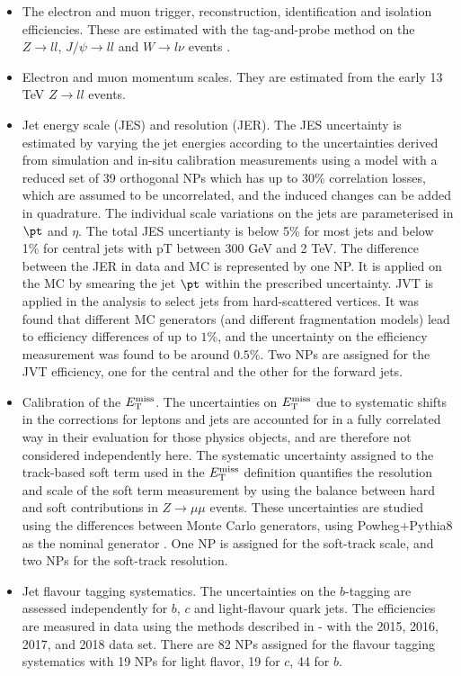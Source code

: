 \begin{itemize}
\item The electron and muon trigger, reconstruction, identification and isolation efficiencies. These are estimated with the tag-and-probe method on the $Z\to ll$, $J/\psi\to ll$ and $W\to l\nu$ events \cite{lep_sys}.
\item Electron and muon momentum scales. They are estimated from the early 13 TeV $Z\to ll$ events.
\item Jet energy scale (JES) and resolution (JER). The JES uncertainty is estimated by varying the jet energies according to the uncertainties derived from simulation and in-situ calibration measurements using a model with a reduced set of 39 orthogonal NPs \cite{jet_sys} which has up to 30\% correlation losses, which are assumed to be uncorrelated, and the induced changes can be added in quadrature. The individual scale variations on the jets are parameterised in $\pt$ and $\eta$. The total JES uncertianty is below 5\% for most jets and below 1\% for central jets with pT between 300 GeV and 2 TeV.
The difference between the JER in data and MC is represented by one NP. It is applied on the MC by smearing the jet $\pt$ within the prescribed uncertainty.
JVT is applied in the analysis to select jets from hard-scattered vertices. It was found that different MC generators (and different fragmentation models) lead to efficiency differences of up to $1\%$, and the uncertainty on the efficiency measurement was found to be around $0.5\%$. Two NPs are assigned for the JVT efficiency, one for the central and the other for the forward jets.
\item Calibration of the $E_{\text{T}}^{\text{miss}}$. The uncertainties on $E_{\text{T}}^{\text{miss}}$ due to systematic shifts in the corrections for leptons and jets are accounted for in a fully correlated way in their evaluation for those physics objects, and are therefore not considered independently here. The systematic uncertainty assigned to the track-based soft term used in the $E_{\text{T}}^{\text{miss}}$ definition quantifies the resolution and scale of the soft term measurement by using the balance between hard and soft contributions in $Z\to\mu\mu$ events. These uncertainties are studied using the differences between Monte Carlo generators, using Powheg+Pythia8 as the nominal generator \cite{met_sys}. One NP is assigned for the soft-track scale, and two NPs for the soft-track resolution.
\item Jet flavour tagging systematics. The uncertainties on the $b$-tagging are assessed independently for $b$, $c$ and light-flavour quark jets\cite{btag_sys1}. The efficiencies are measured in data using the methods described in \cite{btag_sys2}-\cite{btag_sys3} with the 2015, 2016, 2017, and 2018 data set. There are 82 NPs assigned for the flavour tagging systematics with 19 NPs for light flavor, 19 for $c$, 44 for $b$.

\end{itemize}
